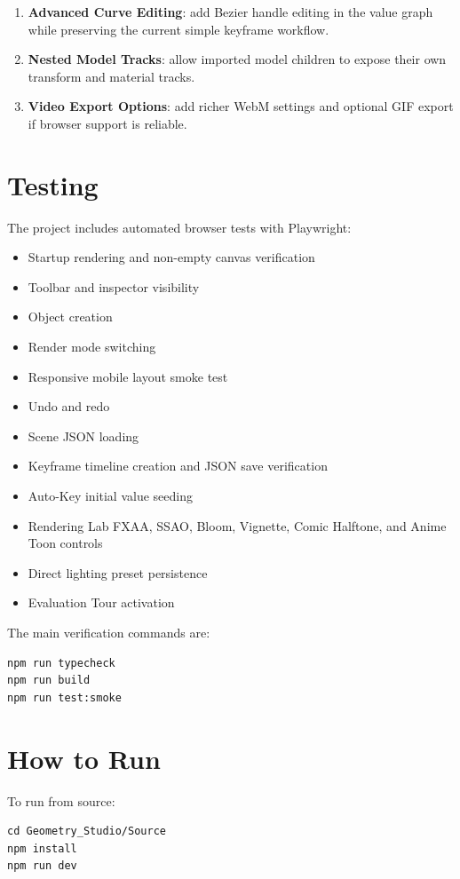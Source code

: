 \documentclass[12pt,a4paper]{article}
\begin{document}
\begin{enumerate}
  \item \textbf{Advanced Curve Editing}: add Bezier handle editing in the value
  graph while preserving the current simple keyframe workflow.
  \item \textbf{Nested Model Tracks}: allow imported model children to expose
  their own transform and material tracks.
  \item \textbf{Video Export Options}: add richer WebM settings and optional GIF
  export if browser support is reliable.
\end{enumerate}

\section{Testing}

The project includes automated browser tests with Playwright:
\begin{itemize}
  \item Startup rendering and non-empty canvas verification
  \item Toolbar and inspector visibility
  \item Object creation
  \item Render mode switching
  \item Responsive mobile layout smoke test
  \item Undo and redo
  \item Scene JSON loading
  \item Keyframe timeline creation and JSON save verification
  \item Auto-Key initial value seeding
  \item Rendering Lab FXAA, SSAO, Bloom, Vignette, Comic Halftone, and Anime Toon controls
  \item Direct lighting preset persistence
  \item Evaluation Tour activation
\end{itemize}

The main verification commands are:
\begin{verbatim}
npm run typecheck
npm run build
npm run test:smoke
\end{verbatim}

\section{How to Run}

To run from source:
\begin{verbatim}
cd Geometry_Studio/Source
npm install
npm run dev
\end{verbatim}
\end{document}
